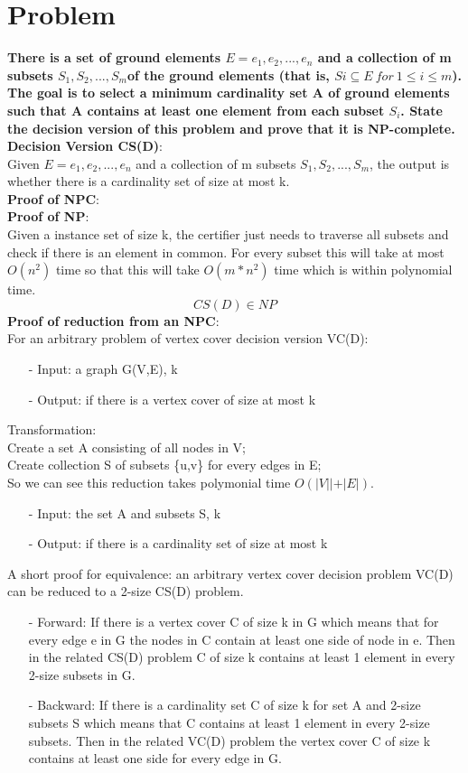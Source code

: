 \documentclass{article}
\begin{document}
\clearpage
\section{Problem \uppercase\expandafter{}}
\textbf{There is a set of ground elements $E = {e_1, e_2, . . . , e_n}$ and a collection of m subsets
$S_1, S_2, . . . , S_m $of the ground elements (that is, $Si \subseteq E\ for\ 1 \le i \le m$).
The goal is to select a minimum cardinality set A of ground elements such that A contains
at least one element from each subset $S_i$.
State the decision version of this problem and prove that it is NP-complete.}\\
\textbf{\Large Decision Version CS(D)}:\\
Given $E = {e_1, e_2, . . . , e_n}$ and a collection of m subsets $S_1, S_2, . . . , S_m $, the output is whether there is a cardinality set of size at most k. \\
\textbf{\Large Proof of NPC}:\\
\textbf{Proof of NP}:\\
Given a instance set of size k, the certifier just needs to traverse all subsets and check if there is an element in common. For every subset this will take at most $O(n^2)$ time so that this will take $O(m*n^2)$ time which is within polynomial time.
$$CS(D) \in NP$$
\textbf{Proof of reduction from an NPC}:\\
For an arbitrary problem of vertex cover decision version VC(D):
\begin{itemize}
\item[-] Input: a graph G(V,E), k
\item[-] Output: if there is a vertex cover of size at most k
\end{itemize}
Transformation:\\
Create a set A consisting of all nodes in V;\\
Create collection S of subsets \{u,v\} for every edges in E;\\
So we can see this reduction takes polymonial time $O(|V||+|E|)$.
\begin{itemize}
\item[-] Input: the set A and subsets S, k
\item[-] Output: if there is a cardinality set of size at most k
\end{itemize}
A short proof for equivalence: an arbitrary vertex cover decision problem VC(D) can be reduced to a 2-size CS(D) problem.
\begin{itemize}
\item[-] Forward: If there is a vertex cover C of size k in G which means that for every edge e in G the nodes in C contain at least one side of node in e. Then in the related CS(D) problem C of size k contains at least 1 element in every 2-size subsets in G.
\item[-] Backward: If there is a cardinality set C of size k for set A and 2-size subsets S which means that C contains at least 1 element in every 2-size subsets. Then in the related VC(D) problem the vertex cover C of size k contains at least one side for every edge in G.
\end{itemize}
\end{document}
